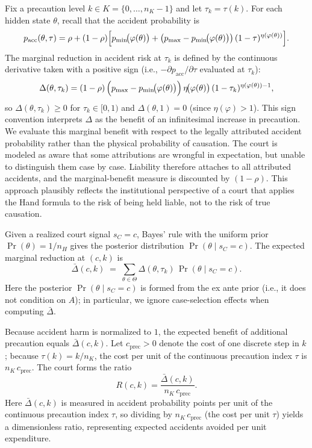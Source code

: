 \documentclass{article}
\begin{document}
Fix a precaution level $k\in K=\{0,\dots,n_K-1\}$ and let $\tau_k=\tau(k)$. For each hidden state $\theta$, recall that the accident probability is
\[
p_{\mathrm{acc}}(\theta,\tau)
=\rho+(1-\rho)\Bigl[p_{\min}\!\bigl(\varphi(\theta)\bigr)
+\bigl(p_{\max}-p_{\min}\!\bigl(\varphi(\theta)\bigr)\bigr)\,(1-\tau)^{\eta(\varphi(\theta))}\Bigr].
\]
The marginal reduction in accident risk at $\tau_k$ is defined by the continuous derivative taken with a positive sign (i.e., $-\partial p_{\mathrm{acc}}/\partial \tau$ evaluated at $\tau_k$):
\[
\Delta(\theta,\tau_k)
=(1-\rho)\,\Bigl(p_{\max}-p_{\min}\!\bigl(\varphi(\theta)\bigr)\Bigr)\,\eta\!\bigl(\varphi(\theta)\bigr)\,(1-\tau_k)^{\eta(\varphi(\theta))-1},
\]
so $\Delta(\theta,\tau_k)\ge 0$ for $\tau_k\in[0,1)$ and $\Delta(\theta,1)=0$ (since $\eta(\varphi)>1$). This sign convention interprets $\Delta$ as the benefit of an infinitesimal increase in precaution. We evaluate this marginal benefit with respect to the legally attributed accident probability rather than the physical probability of causation. The court is modeled as aware that some attributions are wrongful in expectation, but unable to distinguish them case by case. Liability therefore attaches to all attributed accidents, and the marginal-benefit measure is discounted by $(1-\rho)$. This approach plausibly reflects the institutional perspective of a court that applies the Hand formula to the risk of being held liable, not to the risk of true causation.

Given a realized court signal $s_C=c$, Bayes’ rule with the uniform prior $\Pr(\theta)=1/n_H$ gives the posterior distribution $\Pr(\theta \mid s_C=c)$. The expected marginal reduction at $(c,k)$ is
\[
\bar{\Delta}(c,k)\;=\;\sum_{\theta\in\Theta}\Delta(\theta,\tau_k)\,\Pr(\theta\mid s_C=c).
\]
Here the posterior $\Pr(\theta\mid s_C=c)$ is formed from the ex ante prior (i.e., it does not condition on $A$); in particular, we ignore case-selection effects when computing $\bar{\Delta}$.

Because accident harm is normalized to $1$, the expected benefit of additional precaution equals $\bar{\Delta}(c,k)$. Let $c_{\mathrm{prec}}>0$ denote the cost of one discrete step in $k$; because $\tau(k)=k/n_K$, the cost per unit of the continuous precaution index $\tau$ is $n_K\,c_{\mathrm{prec}}$. The court forms the ratio
\[
R(c,k)=\frac{\bar{\Delta}(c,k)}{\,n_K\,c_{\mathrm{prec}}\,}.
\]
Here $\bar{\Delta}(c,k)$ is measured in accident probability points per unit of the continuous precaution index $\tau$, so dividing by $n_K\,c_{\mathrm{prec}}$ (the cost per unit $\tau$) yields a dimensionless ratio, representing expected accidents avoided per unit expenditure.
\end{document}

